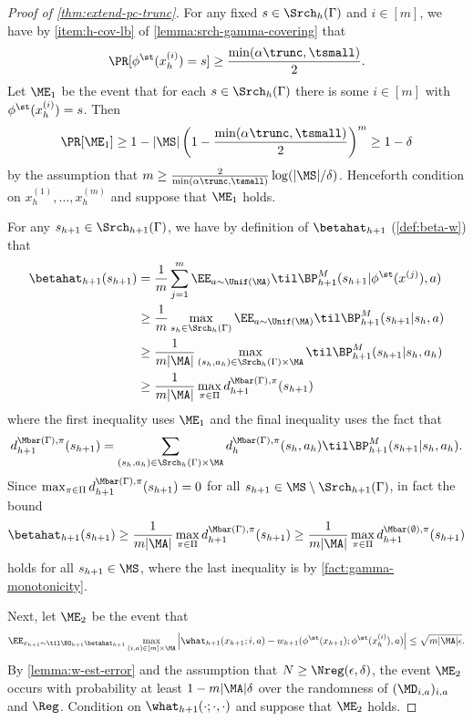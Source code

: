 \begin{proof}[Proof of \cref{thm:extend-pc-trunc}]
For any fixed $s \in \Srch_h(\Gamma)$ and $i \in [m]$, we have by \cref{item:h-cov-lb} of \cref{lemma:srch-gamma-covering} that
\[\Pr[\phi^\st(x_h^{(i)}) = s] \geq \frac{\min(\alpha\trunc,\tsmall)}{2}.\]
Let $\ME_1$ be the event that for each $s \in \Srch_h(\Gamma)$ there is some $i \in [m]$ with $\phi^\st(x_h^{(i)}) = s$. Then
\[\Pr[\ME_1] \geq 1 - |\MS|\left(1 - \frac{\min(\alpha\trunc,\tsmall)}{2}\right)^m \geq 1-\delta\]
by the assumption that $m \geq \frac{2}{\min(\alpha\trunc,\tsmall)} \log(|\MS|/\delta)$. Henceforth condition on $x_h^{(1)},\dots,x_h^{(m)}$ and suppose that $\ME_1$ holds.

For any $s_{h+1} \in \Srch_{h+1}(\Gamma)$, we have by definition of $\betahat_{h+1}$ (\cref{def:beta-w}) that
\begin{align}
\betahat_{h+1}(s_{h+1}) 
&= \frac{1}{m}\sum_{j=1}^m \EE_{a\sim\Unif(\MA)} \til\BP^M_{h+1}(s_{h+1}|\phi^\st(x^{(j)}),a) \nonumber\\ 
&\geq \frac{1}{m} \max_{s_h \in \Srch_h(\Gamma)} \EE_{a\sim\Unif(\MA)} \til\BP^M_{h+1}(s_{h+1}|s_h,a) \nonumber\\ 
&\geq \frac{1}{m|\MA|} \max_{(s_h,a_h) \in \Srch_h(\Gamma)\times\MA} \til\BP^M_{h+1}(s_{h+1}|s_h,a_h) \nonumber\\ 
&\geq \frac{1}{m|\MA|} \max_{\pi\in\Pi} d^{\Mbar(\Gamma),\pi}_{h+1}(s_{h+1}) \label{eq:betahat-coverage}
\end{align}
where the first inequality uses $\ME_1$ and the final inequality uses the fact that \[d^{\Mbar(\Gamma),\pi}_{h+1}(s_{h+1}) = \sum_{(s_h,a_h) \in \Srch_h(\Gamma)\times\MA} d^{\Mbar(\Gamma),\pi}_h(s_h,a_h)\til\BP^M_{h+1}(s_{h+1}|s_h,a_h).\] 
Since $\max_{\pi\in\Pi} d^{\Mbar(\Gamma),\pi}_{h+1}(s_{h+1}) = 0$ for all $s_{h+1} \in \MS\setminus\Srch_{h+1}(\Gamma)$, in fact the bound
\begin{equation} 
\betahat_{h+1}(s_{h+1}) \geq \frac{1}{m|\MA|} \max_{\pi\in\Pi} d^{\Mbar(\Gamma),\pi}_{h+1}(s_{h+1}) \geq \frac{1}{m|\MA|} \max_{\pi\in\Pi} d^{\Mbar(\emptyset),\pi}_{h+1}(s_{h+1})
\label{eq:betahat-coverage-2}
\end{equation} holds for all $s_{h+1} \in \MS$, where the last inequality is by \cref{fact:gamma-monotonicity}.

Next, let $\ME_2$ be the event that 
\begin{equation}
\EE_{x_{h+1} \sim \til\BO_{h+1} \betahat_{h+1}} \max_{(i,a) \in [m]\times\MA} \left|\what_{h+1}(x_{h+1};i,a) - w_{h+1}(\phi^\st(x_{h+1});\phi^\st(x_h^{(i)}),a) \right| \leq \sqrt{m|\MA|\epsilon}.
\label{eq:w-west-applied}
\end{equation}
By \cref{lemma:w-est-error} and the assumption that $N \geq \Nreg(\epsilon,\delta)$, the event $\ME_2$ occurs with probability at least $1-m|\MA|\delta$ over the randomness of $(\MD_{i,a})_{i,a}$ and $\Reg$. Condition on $\what_{h+1}(\cdot;\cdot,\cdot)$ and suppose that $\ME_2$ holds.


\end{proof}
